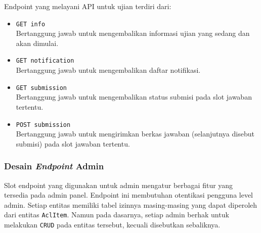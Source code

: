     Endpoint yang melayani API untuk ujian terdiri dari:
    \begin{itemize}
        \item \texttt{GET info} \\
            Bertanggung jawab untuk mengembalikan informasi ujian yang sedang dan akan dimulai.
        \item \texttt{GET notification} \\
            Bertanggung jawab untuk mengembalikan daftar notifikasi.
        \item \texttt{GET submission} \\
            Bertanggung jawab untuk mengembalikan status submisi pada slot jawaban tertentu.
        \item \texttt{POST submission} \\
            Bertanggung jawab untuk mengirimkan berkas jawaban (selanjutnya disebut submisi) pada slot
            jawaban tertentu.
    \end{itemize}
    
\subsubsection{Desain \textit{Endpoint} Admin}
    Slot endpoint yang digunakan untuk admin mengatur berbagai fitur yang tersedia pada admin panel.
    Endpoint ini membutuhan otentikasi pengguna level admin. Setiap entitas memiliki tabel izinnya
    masing-masing yang dapat diperoleh dari entitas \texttt{AclItem}. Namun pada dasarnya, setiap
    admin berhak untuk melakukan \texttt{CRUD} pada entitas tersebut, kecuali disebutkan sebaliknya.
    
